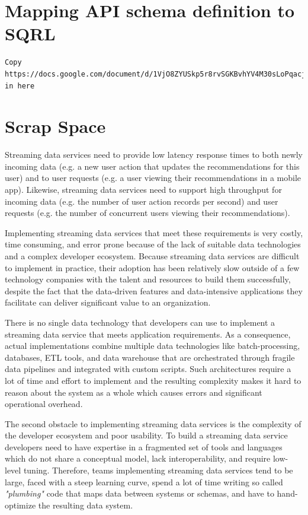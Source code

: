 \documentclass[	DIV=calc,%
							paper=letter,%
							fontsize=11pt,%
							twocolumn]{scrartcl}	 					%
\begin{document}
\section{Mapping API schema definition to SQRL}
\label{appendix:sqrl2graphql}

\begin{verbatim}
Copy https://docs.google.com/document/d/1VjO8ZYUSkp5r8rvSGKBvhYV4M30sLoPqacjUyIkonXM/edit# in here
\end{verbatim}


\section{Scrap Space}


Streaming data services need to provide low latency response times to both newly incoming data (e.g. a new user action that updates the recommendations for this user) and to user requests (e.g. a user viewing their recommendations in a mobile app). Likewise, streaming data services need to support high throughput for incoming data (e.g. the number of user action records per second) and user requests (e.g. the number of concurrent users viewing their recommendations).

Implementing streaming data services that meet these requirements is very costly, time consuming, and error prone because of the lack of suitable data technologies and a complex developer ecosystem. Because streaming data services are difficult to implement in practice, their adoption has been relatively slow outside of a few technology companies with the talent and resources to build them successfully, despite the fact that the data-driven features and data-intensive applications they facilitate can deliver significant value to an organization.

There is no single data technology that developers can use to implement a streaming data service that meets application requirements. As a consequence, actual implementations combine multiple data technologies like batch-processing, databases, ETL tools, and data warehouse that are orchestrated through fragile data pipelines and integrated with custom scripts. Such architectures require a lot of time and effort to implement and the resulting complexity makes it hard to reason about the system as a whole which causes errors and significant operational overhead.


The second obstacle to implementing streaming data services is the complexity of the developer ecosystem and poor usability. To build a streaming data service developers need to have expertise in a fragmented set of tools and languages which do not share a conceptual model, lack interoperability, and require low-level tuning. Therefore, teams implementing streaming data services tend to be large, faced with a steep learning curve, spend a lot of time writing so called \textit{"plumbing"} code that maps data between systems or schemas, and have to hand-optimize the resulting data system.
\end{document}
